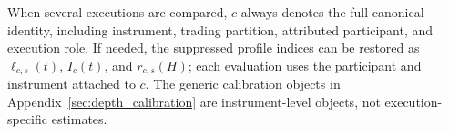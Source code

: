 When several executions are compared, $c$ always denotes the full canonical identity, including instrument, trading partition, attributed participant, and execution role. If needed, the suppressed profile indices can be restored as $\ell_{c,s}(t)$, $I_c(t)$, and $r_{c,s}(H)$; each evaluation uses the participant and instrument attached to $c$. The generic calibration objects in Appendix~\ref{sec:depth_calibration} are instrument-level objects, not execution-specific estimates.
